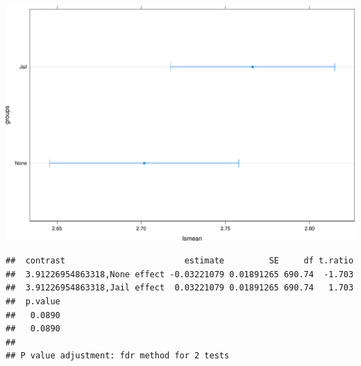\begin{frame}[fragile]

\begin{Shaded}
\begin{Highlighting}[]
\end{Highlighting}
\end{Shaded}

\includegraphics{Conditional_Models_files/figure-beamer/unnamed-chunk-35-1.pdf}

\end{frame}

\begin{frame}[fragile]

\begin{Shaded}
\begin{Highlighting}[]
 \NormalTok{)}
\end{Highlighting}
\end{Shaded}

\begin{verbatim}
##  contrast                        estimate         SE     df t.ratio
##  3.91226954863318,None effect -0.03221079 0.01891265 690.74  -1.703
##  3.91226954863318,Jail effect  0.03221079 0.01891265 690.74   1.703
##  p.value
##   0.0890
##   0.0890
## 
## P value adjustment: fdr method for 2 tests
\end{verbatim}

\end{frame}

